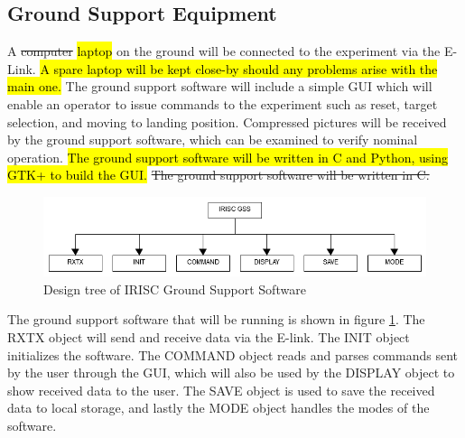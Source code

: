 \pagebreak
\subsection{Ground Support Equipment}\label{sec:4.9}
A \st{computer} \hl{laptop} on the ground will be connected to the experiment via the E-Link. \hl{A spare laptop will be kept close-by should any problems arise with the main one.} The ground support software will include a simple GUI which will enable an operator to issue commands to the experiment such as reset, target selection, and moving to landing position. Compressed pictures will be received by the ground support software, which can be examined to verify nominal operation. \hl{The ground support software will be written in C and Python, using GTK+ to build the GUI.} \st{The ground support software will be written in C.}

\begin{figure}[h]
	\centering
	\includegraphics[width=\textwidth]{4-experiment-design/img/software/GSS-tree.png}
	\caption{Design tree of IRISC Ground Support Software}
	\label{fig:gss-tree}
\end{figure}

The ground support software that will be running is shown in figure \ref{fig:gss-tree}. The RXTX object will send and receive data via the E-link. The INIT object initializes the software. The COMMAND object reads and parses commands sent by the user through the GUI, which will also be used by the DISPLAY object to show received data to the user. The SAVE object is used to save the received data to local storage, and lastly the MODE object handles the modes of the software.
\raggedbottom
